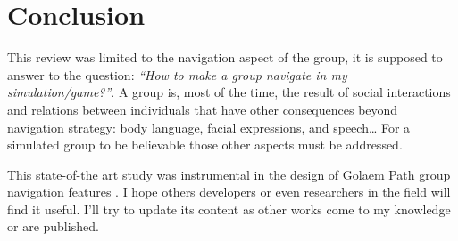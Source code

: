 \documentclass[a4paper,titlepage]{article}
\begin{document}
\section{Conclusion}
\label{sec:conclusion}

This review was limited to the navigation aspect of the group, it is supposed to answer to the question: \emph{“How to make a group navigate in my simulation/game?”}. A group is, most of the time, the result of social interactions and relations between individuals that have other consequences beyond navigation strategy: body language, facial expressions, and speech… For a simulated group to be believable those other aspects must be addressed.

This state-of-the art study was instrumental in the design of Golaem Path group navigation features \cite{GolaemPath:tw}. I hope others developers or even researchers in the field will find it useful. I’ll try to update its content as other works come to my knowledge or are published. 

\pagebreak


\end{document}
